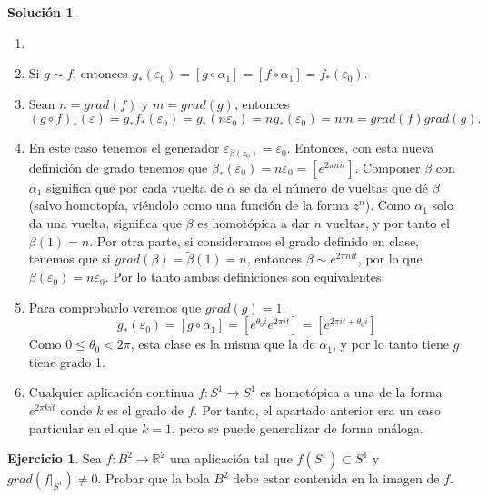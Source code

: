 \documentclass{article}
\theoremstyle{plain}
\theoremstyle{definition}
\newtheorem{exercise}{Ejercicio}
\newtheorem*{sol*}{Solución}
\begin{document}
\begin{sol*}
\begin{enumerate}
\item[]
\item Si $g\sim f$, entonces $g_*(\varepsilon_0)=[g\circ\alpha_1]=[f\circ\alpha_1]=f_*(\varepsilon_0)$.
\item Sean $n=grad(f)$ y $m=grad(g)$, entonces $$(g\circ f)_*(\varepsilon)=g_*f_*(\varepsilon_0)=g_*(n\varepsilon_0)=ng_*(\varepsilon_0)=nm=grad(f)grad(g).$$
\item En este caso tenemos el generador $\varepsilon_{\beta(z_0)}=\varepsilon_0$. Entonces, con esta nueva definición de grado tenemos que $\beta_*(\varepsilon_0)=n\varepsilon_0=[e^{2\pi n it}]$. Componer $\beta$ con $\alpha_1$ significa que por cada vuelta de $\alpha$ se da el número de vueltas que dé $\beta$ (salvo homotopía, viéndolo como una función de la forma $z^n$). Como $\alpha_1$ solo da una vuelta, significa que $\beta$ es homotópica a dar $n$ vueltas, y por tanto el $\beta(1)=n$. Por otra parte, si consideramos el grado definido en clase, tenemos que si $grad(\beta
)=\tilde{\beta}(1)=n$, entonces $\beta\sim e^{2\pi n it}$, por lo que $\beta(\varepsilon_0)=n\varepsilon_0$. Por lo tanto ambas definiciones son equivalentes.
\item Para comprobarlo veremos que $grad(g)=1$. $$g_*(\varepsilon_0)=[g\circ\alpha_1]=[e^{\theta_0 i}e^{2\pi i t}]=[e^{2\pi it +\theta_0 i}]$$ 
Como $0\leq \theta_0 < 2\pi$, esta clase es la misma que la de $\alpha_1$, y por lo tanto tiene $g$ tiene grado 1.
\item Cualquier aplicación continua $f:S^1\to S^1$ es homotópica a una de la forma $e^{2\pi k it}$ conde $k$ es el grado de $f$. Por tanto, el apartado anterior era un caso particular en el que $k=1$, pero se puede generalizar de forma análoga.
\end{enumerate}
\end{sol*}

\newpage

\begin{exercise}
Sea $f:B^2 \to \mathbb{R}^2$ una aplicaci\'on tal que $f(S^1) \subset S^1$ y
$grad (f|_{S^1})\neq 0$. Probar que la bola $B^2$ debe estar contenida en la imagen de $f$.
\end{exercise}

\newpage
\end{document}
